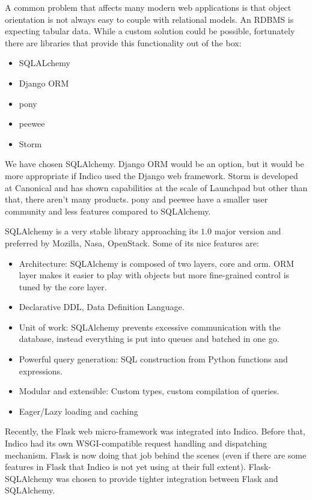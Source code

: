 A common problem that affects many modern web applications is that object orientation is not always easy to couple with relational models. An RDBMS is expecting tabular data. While a custom solution could be possible, fortunately there are libraries that provide this functionality out of the box:
\begin{itemize}
  \item SQLALchemy
  \item Django ORM
  \item pony
  \item peewee
  \item Storm
\end{itemize}

We have chosen SQLAlchemy. Django ORM would be an option, but it would be more appropriate if Indico used the Django web framework. Storm is developed at Canonical and has shown capabilities at the scale of Launchpad but other than that, there aren't many products. pony and peewee have a smaller user community and less features compared to SQLAlchemy.

SQLAlchemy is a very stable library approaching its $1.0$ major version and preferred by Mozilla, Nasa, OpenStack. Some of its nice features are:
\begin{itemize}
  \item Architecture: SQLAlchemy is composed of two layers, core and orm. ORM layer makes it easier to play with objects but more fine-grained control is tuned by the core layer.
  \item Declarative DDL, Data Definition Language.
  \item Unit of work: SQLAlchemy prevents excessive communication with the database, instead everything is put into queues and batched in one go.
  \item Powerful query generation: SQL construction from Python functions and expressions.
  \item Modular and extensible: Custom types, custom compilation of queries.
  \item Eager/Lazy loading and caching
\end{itemize}

Recently, the Flask web micro-framework was integrated into Indico. Before that, Indico had its own WSGI-compatible request handling and dispatching mechanism. Flask is now doing that job behind the scenes (even if there are some features in Flask that Indico is not yet using at their full extent). Flask-SQLAlchemy was chosen to provide tighter integration between Flask and SQLAlchemy.

